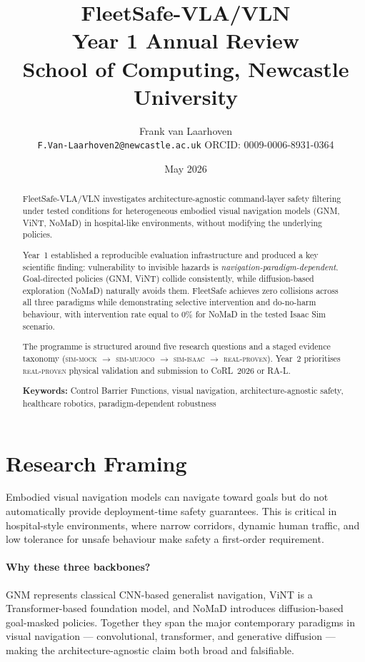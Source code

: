 \documentclass[12pt,a4paper]{article}
\title{\textbf{FleetSafe-VLA/VLN}\\[6pt]
       \large Year 1 Annual Review\\[4pt]
       \normalsize School of Computing, Newcastle University}
\author{Frank van Laarhoven\\
        \small \texttt{F.Van-Laarhoven2@newcastle.ac.uk}\quad
        ORCID: 0009-0006-8931-0364}
\date{May 2026}
\begin{document}
\maketitle
\tableofcontents
\newpage

\begin{abstract}
FleetSafe-VLA/VLN investigates architecture-agnostic command-layer safety
filtering under tested conditions for heterogeneous embodied visual navigation
models (GNM, ViNT, NoMaD) in hospital-like environments, without modifying the
underlying policies.

Year~1 established a reproducible evaluation infrastructure and produced a key
scientific finding: vulnerability to invisible hazards is
\emph{navigation-paradigm-dependent}. Goal-directed policies (GNM, ViNT)
collide consistently, while diffusion-based exploration (NoMaD) naturally
avoids them. FleetSafe achieves zero collisions across all three paradigms
while demonstrating selective intervention and do-no-harm behaviour, with
intervention rate equal to 0\% for NoMaD in the tested Isaac Sim scenario.

The programme is structured around five research questions and a staged
evidence taxonomy (\textsc{sim-mock} $\to$ \textsc{sim-mujoco} $\to$
\textsc{sim-isaac} $\to$ \textsc{real-proven}). Year~2 prioritises
\textsc{real-proven} physical validation and submission to CoRL~2026 or RA-L.

\medskip
\noindent\textbf{Keywords:} Control Barrier Functions, visual navigation,
architecture-agnostic safety, healthcare robotics, paradigm-dependent
robustness
\end{abstract}

\section{Research Framing}
\label{sec:framing}

Embodied visual navigation models can navigate toward goals but do not
automatically provide deployment-time safety guarantees. This is critical in
hospital-style environments, where narrow corridors, dynamic human traffic, and
low tolerance for unsafe behaviour make safety a first-order requirement.

\paragraph{Why these three backbones?}
GNM represents classical CNN-based generalist navigation, ViNT is a
Transformer-based foundation model, and NoMaD introduces diffusion-based
goal-masked policies. Together they span the major contemporary paradigms in
visual navigation --- convolutional, transformer, and generative diffusion ---
making the architecture-agnostic claim both broad and falsifiable.
\end{document}
